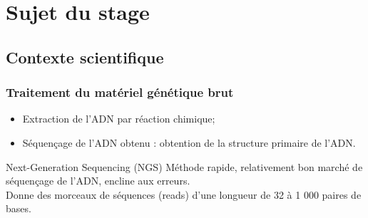 \documentclass{beamer}
\begin{document}
\section{Sujet du stage}





\subsection{Contexte scientifique}


\begin{frame}
\frametitle{Traitement du matériel génétique brut}

\begin{itemize}
\item Extraction de l'ADN par réaction chimique;
\item Séquençage de l'ADN obtenu : obtention de la \alert{structure primaire} de l'ADN.
\end{itemize}

\begin{block}{Next-Generation Sequencing (NGS)}
Méthode rapide, relativement bon marché de séquençage de l'ADN, encline aux erreurs. \\
Donne des morceaux de séquences (\alert{reads}) d'une longueur de 32 à 1 000 paires de bases.
\end{block}

\end{frame}
\end{document}
